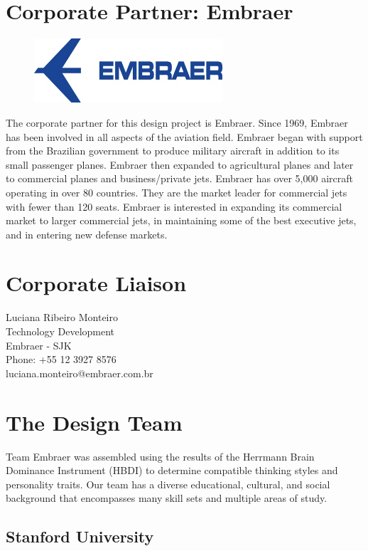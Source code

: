 \section{Corporate Partner: Embraer}

\begin{figure}[h]
  \centering
     \includegraphics[width=7cm]{images/image010.jpg}
  \label{fig:10}
\end{figure}

The corporate partner for this design project is Embraer.  Since 1969, Embraer has been involved in all aspects of the aviation field.  Embraer began with support from the Brazilian government to produce military aircraft in addition to its small passenger planes.  Embraer then expanded to agricultural planes and later to commercial planes and business/private jets.  Embraer has over 5,000 aircraft operating in over 80 countries.  They are the market leader for commercial jets with fewer than 120 seats.  Embraer is interested in expanding its commercial market to larger commercial jets, in maintaining some of the best executive jets, and in entering new defense markets.

\section*{Corporate Liaison}
Luciana Ribeiro Monteiro \\
  Technology Development \\
  Embraer - SJK \\
  Phone: +55 12 3927 8576 \\
  luciana.monteiro@embraer.com.br

\section{The Design Team}
Team Embraer was assembled using the results of the Herrmann Brain Dominance Instrument (HBDI) to determine compatible thinking styles and personality traits. Our team has a diverse educational, cultural, and social background that encompasses many skill sets and multiple areas of study. 

\subsection*{Stanford University}


